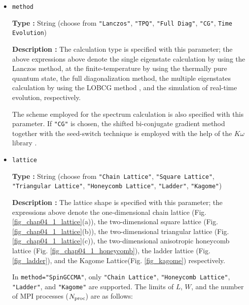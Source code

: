 \begin{itemize}
When \verb|model="SpinGCCMA"|,
by using a more efficient algorithm\footnote{Y. Yamaji \textit{et. al.}, manuscript in preparation.}, 
$\HPhi$ calculates a system that is the same as \verb|"SpinGC"|.
However, supported models and MPI processes are highly limited.
See \verb|"Lattice"| section.

\item \verb|method|
  
{\bf Type :} String (choose from \verb|"Lanczos"|, \verb|"TPQ"|, \verb|"Full Diag"|, \verb|"CG"|, \verb|Time Evolution|)

{\bf Description :} The calculation type is specified with this parameter;
the above expressions above denote 
the single eigenstate calculation by using the Lanczos method,
at the finite-temperature by using the thermally pure quantum state,
the full diagonalization method,
the multiple eigenstates calculation by using the LOBCG method
\cite{doi:10.1137/S1064827500366124,transactionJSCES2006},
and the simulation of real-time evolution,
respectively.

The scheme employed for the spectrum calculation is also specified with this parameter.
If \verb|"CG"| is chosen, the shifted bi-conjugate gradient method \cite{Frommer2003}
together with the seed-switch technique \cite{doi:10.1143/JPSJ.77.114713} is employed
with the help of the $K\omega$ library \cite{komega}.

\item \verb|lattice|

{\bf Type :} String (choose from \verb|"Chain Lattice"|, \verb|"Square Lattice"|, 
\verb|"Triangular Lattice"|, \verb|"Honeycomb Lattice"|, \verb|"Ladder"|, \verb|"Kagome"|)

{\bf Description :} The lattice shape is specified with this parameter;
the expressions above denote
the one-dimensional chain lattice (Fig. \ref{fig_chap04_1_lattice}(a)), 
the two-dimensional square lattice (Fig. \ref{fig_chap04_1_lattice}(b)),
the two-dimensional triangular lattice (Fig. \ref{fig_chap04_1_lattice}(c)),
the two-dimensional anisotropic honeycomb lattice (Fig. \ref{fig_chap04_1_honeycomb}),
the ladder lattice (Fig. \ref{fig_ladder}),
and
the Kagome Lattice(Fig. \ref{fig_kagome})
respectively.

In \verb|method="SpinGCCMA"|,
only \verb|"Chain Lattice"|, \verb|"Honeycomb Lattice"|, 
\verb|"Ladder"|, and \verb|"Kagome"| are supported.
The limits of $L$, $W$, and the number of MPI processes ($N_{\rm proc}$) are as follows:

\begin{itemize}


\end{itemize}
\end{itemize}
